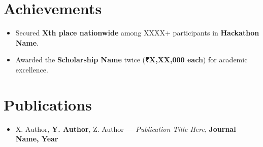 \documentclass[letterpaper,11pt]{article}
\newcommand{\resumeItem}[1]{
  \item\small{
    {#1 \vspace{-2pt}}
  }
}
\newcommand{\resumeSubHeadingListStart}{\begin{itemize}[leftmargin=0.15in, label={}, itemsep=2pt]}
\newcommand{\resumeSubHeadingListEnd}{\end{itemize}}
\newcommand{\resumeItemListStart}{\begin{itemize}[itemsep=2pt, topsep=2pt]}
\newcommand{\resumeItemListEnd}{\end{itemize}\vspace{-4pt}}
\begin{document}
\section{Achievements}
\resumeItemListStart 
  \resumeItem{Secured \textbf{Xth place nationwide} among XXXX+ participants in \textbf{Hackathon Name}.}
  \resumeItem{Awarded the \textbf{Scholarship Name} twice (\textbf{₹X,XX,000 each}) for academic excellence.}
\resumeItemListEnd

\section{Publications}
\resumeSubHeadingListStart
  \item
    X. Author, \textbf{Y. Author}, Z. Author — 
    \emph{Publication Title Here}, 
    \textbf{Journal Name, Year}
\resumeSubHeadingListEnd
\end{document}
